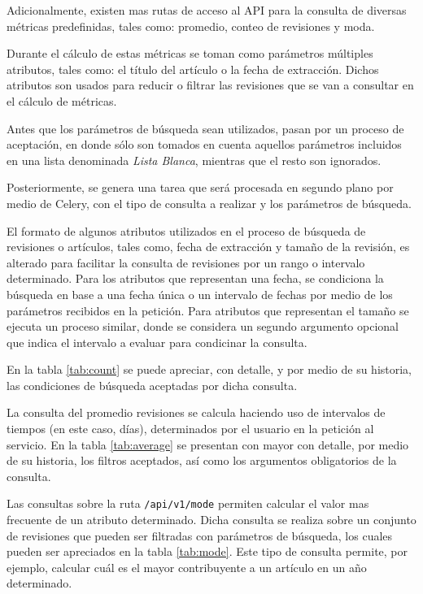 Adicionalmente, existen mas rutas de acceso al API para la consulta de diversas métricas predefinidas, tales como: promedio, conteo de revisiones y moda.

Durante el cálculo de estas métricas se toman como parámetros múltiples atributos, tales como: el título del artículo o la fecha de extracción.
Dichos atributos son usados para reducir o filtrar las revisiones que se van a consultar en el cálculo de  métricas.

Antes que los parámetros de búsqueda sean utilizados, pasan por un proceso de aceptación, en donde sólo son tomados en cuenta aquellos parámetros incluidos en una lista denominada \textit{Lista Blanca}, mientras que el resto son ignorados.

Posteriormente, se genera una tarea que será procesada en segundo plano por medio de Celery, con el tipo de consulta a realizar y los parámetros de búsqueda.

El formato de algunos atributos utilizados en el proceso de búsqueda de revisiones o artículos, tales como, fecha de extracción y tamaño de la revisión, es alterado para facilitar la consulta de revisiones por un rango o intervalo determinado.
Para los atributos que representan una fecha, se condiciona la búsqueda en base a una fecha única o un intervalo de fechas por medio de los parámetros recibidos en la petición.
Para atributos que representan el tamaño se ejecuta un proceso similar, donde se considera un segundo argumento opcional que indica el intervalo a evaluar para condicinar la consulta.

En la tabla \ref{tab:count} se puede apreciar, con detalle, y por medio de su historia, las condiciones de búsqueda aceptadas por dicha consulta.



La consulta del promedio revisiones se calcula haciendo uso de intervalos de tiempos (en este caso, días), determinados por el usuario en la petición al servicio.
En la tabla \ref{tab:average} se presentan con mayor con detalle, por medio de su historia, los filtros aceptados, así como los argumentos obligatorios de la consulta.



Las consultas sobre la ruta \texttt{/api/v1/mode} permiten calcular el valor mas frecuente de un atributo determinado.
Dicha consulta se realiza sobre un conjunto de revisiones que pueden ser filtradas con parámetros de búsqueda, los cuales pueden ser apreciados en la tabla \ref{tab:mode}.
Este tipo de consulta permite, por ejemplo, calcular cuál es el mayor contribuyente a un artículo en un año determinado.

